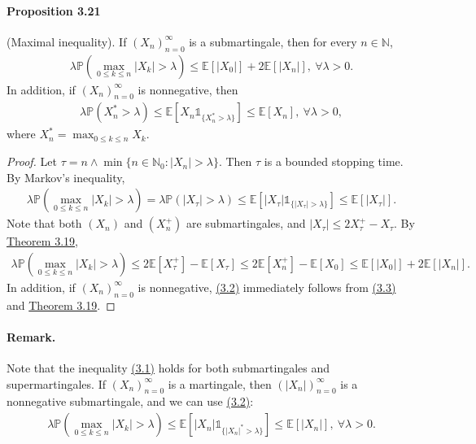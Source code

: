 \documentclass{article}
\numberwithin{equation}{section}
\newcommand{\E}{\mathbb{E}}
\renewcommand{\P}{\mathbb{P}}
\theoremstyle{plain}
\theoremstyle{definition}
\begin{document}
\paragraph{Proposition 3.21\label{prop:3.21}} (Maximal inequality). If $(X_n)_{n=0}^\infty$ is a submartingale, then for every $n\in\mathbb{N}$,
\begin{align*}
	\lambda\P\left(\max_{0\leq k\leq n}\vert X_k\vert>\lambda\right)\leq \E[\vert X_0\vert] + 2\E[\vert X_n\vert],\ \forall \lambda>0.\tag{3.1}\label{eq:3.1}
\end{align*}
In addition, if $(X_n)_{n=0}^\infty$ is nonnegative, then
\begin{align*}
	\lambda\P\left(X_n^*>\lambda\right)\leq \E[X_n\mathds{1}_{\{X_n^*>\lambda\}}]\leq\E[X_n],\ \forall \lambda>0,\tag{3.2}\label{eq:3.2}
\end{align*}
where $X_n^*=\max_{0\leq k\leq n} X_k$.
\begin{proof}
Let $\tau=n\wedge\min\{n\in\mathbb{N}_0:\vert X_n\vert>\lambda\}$. Then $\tau$ is a bounded stopping time. By Markov's inequality,
\begin{align*}
	\lambda\P\left(\max_{0\leq k\leq n}\vert X_k\vert>\lambda\right)=\lambda\P(\vert X_\tau\vert>\lambda)\leq\E\left[\vert X_\tau\vert\mathds{1}_{\{\vert X_\tau\vert>\lambda\}}\right]\leq\E[\vert X_\tau\vert].\tag{3.3}\label{eq:3.3}
\end{align*}
Note that both $(X_n)$ and $(X_n^+)$ are submartingales, and $\vert X_\tau\vert\leq 2X_\tau^+ - X_\tau$. By \hyperref[thm:3.19]{Theorem 3.19},
\begin{align*}
	\lambda\P\left(\max_{0\leq k\leq n}\vert X_k\vert>\lambda\right)\leq2\E[X_\tau^+]-\E
	[X_\tau]\leq 2\E[X_n^+]-\E[X_0]\leq \E
	[\vert X_0\vert] + 2\E\left[\vert X_n\vert\right].
\end{align*}
In addition, if $(X_n)_{n=0}^\infty$ is nonnegative, \hyperref[eq:3.2]{(3.2)} immediately follows from \hyperref[eq:3.3]{(3.3)} and \hyperref[thm:3.19]{Theorem 3.19}.
\end{proof}
\paragraph{Remark.} Note that the inequality \hyperref[eq:3.1]{(3.1)} holds for both submartingales and supermartingales. If $(X_n)_{n=0}^\infty$ is a martingale, then $(\vert X_n\vert)_{n=0}^\infty$ is a nonnegative submartingale, and we can use \hyperref[eq:3.2]{(3.2)}:
\begin{align*}
	\lambda\P\left(\max_{0\leq k\leq n} \vert X_k\vert>\lambda\right)\leq \E[\vert X_n\vert\mathds{1}_{\{\vert X_n\vert^*>\lambda\}}]\leq\E[\vert X_n\vert],\ \forall \lambda>0.
\end{align*}
\end{document}
